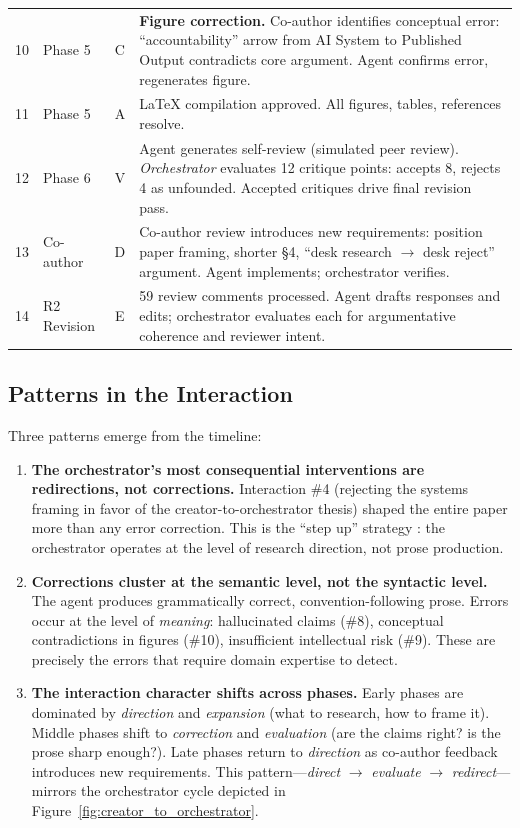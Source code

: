 \begin{table}[H]
\begin{tabularx}{\textwidth}{@{} c l c X @{}}
10 & Phase 5 & C & \textbf{Figure correction.} Co-author identifies conceptual error: ``accountability'' arrow from AI System to Published Output contradicts core argument. Agent confirms error, regenerates figure. \\[0.3em]
11 & Phase 5 & A & \LaTeX{} compilation approved. All figures, tables, references resolve. \\[0.3em]
12 & Phase 6 & V & Agent generates self-review (simulated peer review). \textit{Orchestrator} evaluates 12 critique points: accepts 8, rejects 4 as unfounded. Accepted critiques drive final revision pass. \\[0.3em]
13 & Co-author & D & Co-author review introduces new requirements: position paper framing, shorter \S4, ``desk research $\rightarrow$ desk reject'' argument. Agent implements; orchestrator verifies. \\[0.3em]
14 & R2 Revision & E & 59 review comments processed. Agent drafts responses and edits; orchestrator evaluates each for argumentative coherence and reviewer intent. \\
\bottomrule
\end{tabularx}
\end{table}

\subsection{Patterns in the Interaction}

Three patterns emerge from the timeline:

\begin{enumerate}
    \item \textbf{The orchestrator's most consequential interventions are redirections, not corrections.} Interaction \#4 (rejecting the systems framing in favor of the creator-to-orchestrator thesis) shaped the entire paper more than any error correction. This is the ``step up'' strategy \citep{davenport2016just}: the orchestrator operates at the level of research direction, not prose production.

    \item \textbf{Corrections cluster at the semantic level, not the syntactic level.} The agent produces grammatically correct, convention-following prose. Errors occur at the level of \textit{meaning}: hallucinated claims (\#8), conceptual contradictions in figures (\#10), insufficient intellectual risk (\#9). These are precisely the errors that require domain expertise to detect.

    \item \textbf{The interaction character shifts across phases.} Early phases are dominated by \textit{direction} and \textit{expansion} (what to research, how to frame it). Middle phases shift to \textit{correction} and \textit{evaluation} (are the claims right? is the prose sharp enough?). Late phases return to \textit{direction} as co-author feedback introduces new requirements. This pattern---\textit{direct} $\rightarrow$ \textit{evaluate} $\rightarrow$ \textit{redirect}---mirrors the orchestrator cycle depicted in Figure~\ref{fig:creator_to_orchestrator}.
\end{enumerate}

